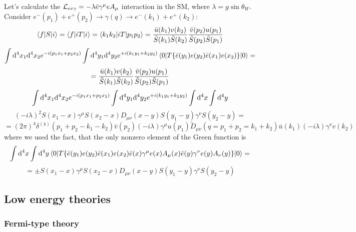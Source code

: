 Let's calculate the ${\mathcal L}_{ee\gamma}=-\lambda \bar e\gamma^\mu e A_\mu$ interaction in the SM, where $\lambda=g\sin\theta_W$. Consider $e^-(p_1)+e^+(p_2)\to\gamma(q)\to e^-(k_1)+e^+(k_2)$: 
\begin{equation*}
  \mathinner{\langle{f|S|i}\rangle}= \mathinner{\langle{f|iT|i}\rangle}= \mathinner{\langle{k_1 k_2|iT|p_1p_2}\rangle}= {\bar u(k_1) v(k_2)\over\tilde S(k_1)\tilde S(k_2)} {\bar v(p_2) u(p_1)\over\tilde S(p_2)\tilde S(p_1)}
\end{equation*}
\begin{equation*}
  \int{\rm d}^4 x_1{\rm d}^4 x_2 e^{-i (p_1x_1 + p_2x_2)} \int{\rm d}^4 y_1{\rm d}^4 y_2 e^{+i (k_1y_1 + k_2y_2)} \mathinner{\langle{0|T\{\bar e(y_1) e(y_2) \bar e(x_1) e(x_2)\}|0}\rangle} =
\end{equation*}
\begin{equation*}
  = {\bar u(k_1) v(k_2)\over\tilde S(k_1)\tilde S(k_2)} {\bar v(p_2) u(p_1)\over\tilde S(p_2)\tilde S(p_1)}
\end{equation*}
\begin{equation*}
  \int{\rm d}^4 x_1{\rm d}^4 x_2 e^{-i (p_1x_1 + p_2x_2)} \int{\rm d}^4 y_1{\rm d}^4 y_2 e^{+i (k_1y_1 + k_2y_2)} \int{\rm d}^4 x \int{\rm d}^4 y
\end{equation*}
\begin{equation*}
  (-i\lambda)^2 S(x_1-x)\gamma^\mu S(x_2-x) D_{\mu\nu}(x-y)S(y_1-y)\gamma^\nu S(y_2-y) =
\end{equation*}
\begin{equation*}
  =(2\pi)^4\delta^{(4)}(p_1+p_2-k_1-k_2)\bar v(p_2)(-i\lambda)\gamma^\mu u(p_1)\tilde D_{\mu\nu}(q=p_1+p_2=k_1+k_2) \bar u(k_1)(-i\lambda)\gamma^\nu v(k_2)
\end{equation*}
where we used the fact, that the only nonzero element of the Green function is 
\begin{equation*}
  \int{\rm d}^4 x \int{\rm d}^4 y \mathinner{\langle{0|T\{\bar e(y_1) e(y_2) \bar e(x_1) e(x_2) \bar e(x)\gamma^\mu e(x) A_\mu(x) \bar e(y)\gamma^\nu e(y) A_\nu(y) \}|0}\rangle} =
\end{equation*}
\begin{equation*}
  =\pm S(x_1-x) \gamma^\mu S(x_2-x)D_{\mu\nu}(x-y)S(y_1-y)\gamma^\nu S(y_2-y)
\end{equation*}

\subsection{Low energy theories}

\subsubsection{Fermi-type theory}

